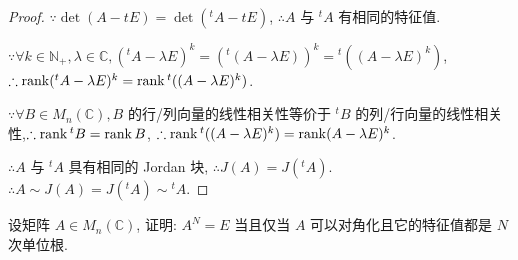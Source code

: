 \documentclass[color=black,device=normal,lang=cn,mode=geye]{elegantnote}
\begin{document}
\begin{proof}
    $\because\det(A-tE)=\det({}^tA-tE)$, $\therefore A$ 与 $^tA$ 有相同的特征值.

    $\because\forall k\in\mathbb{N}_+,\lambda\in\mathbb{C},({}^tA-\lambda E)^k=({}^t(A-\lambda E))^k={}^t((A-\lambda E)^k)$, $\therefore\operatorname{rank} ({}^tA-\lambda E)^k=\operatorname{rank} {}^t((A-\lambda E)^k)$.
    
    $\because\forall B\in M_n(\mathbb{C}),B$ 的行/列向量的线性相关性等价于 $^tB$ 的列/行向量的线性相关性,$\therefore\operatorname{rank} {}^tB=\operatorname{rank} B$, $\therefore\operatorname{rank} {}^t((A-\lambda E)^k)=\operatorname{rank} (A-\lambda E)^k$.
    
    $\therefore A$ 与 $^tA$ 具有相同的 Jordan 块, $\therefore J(A)=J({}^tA)$. $\therefore A\sim J(A)=J({}^tA)\sim{}^tA$.
\end{proof}
\begin{exercise}%
    设矩阵 $A\in M_n(\mathbb{C})$, 证明: $A^N=E$ 当且仅当 $A$ 可以对角化且它的特征值都是 $N$ 次单位根.
\end{exercise}
\end{document}
